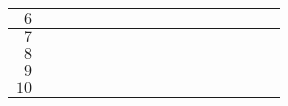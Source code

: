 \begin{tabularx}{0.99\textwidth}{|r|*{15}{X|}}
  \hline
  $6$ &               &                 &          &          &          &           &            &           &        &        &        &         &         &          &          \\[0.3cm]
  \hline
  $7$ &               &                 &          &          &          &           &            &           &        &        &        &         &         &          &          \\[0.3cm]
  \hline
  $8$ &               &                 &          &          &          &           &            &           &        &        &        &         &         &          &          \\[0.3cm]
  \hline
  $9$ &               &                 &          &          &          &           &            &           &        &        &        &         &         &          &          \\[0.3cm]
  \hline
  $10$&               &                 &          &          &          &           &            &           &        &        &        &         &         &          &          \\[0.3cm]
  \hline
\end{tabularx}

